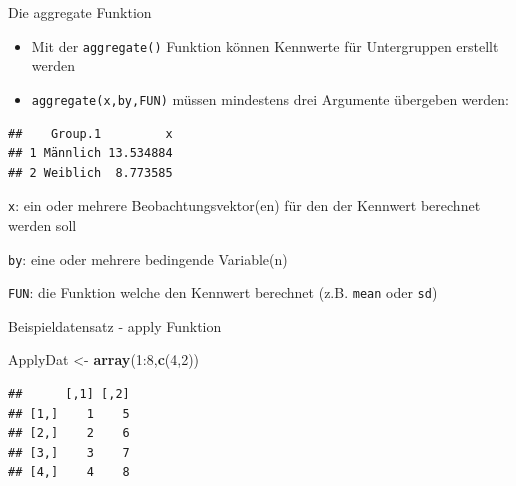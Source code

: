 \documentclass[ignorenonframetext,]{beamer}
\newenvironment{Shaded}{}{}
\newcommand{\KeywordTok}[1]{\textcolor[rgb]{0.00,0.44,0.13}{\textbf{{#1}}}}
\newcommand{\DataTypeTok}[1]{\textcolor[rgb]{0.56,0.13,0.00}{{#1}}}
\newcommand{\DecValTok}[1]{\textcolor[rgb]{0.25,0.63,0.44}{{#1}}}
\newcommand{\StringTok}[1]{\textcolor[rgb]{0.25,0.44,0.63}{{#1}}}
\newcommand{\NormalTok}[1]{{#1}}
\providecommand{\tightlist}{%
\setlength{\itemsep}{0pt}\setlength{\parskip}{0pt}}
\begin{document}
\begin{frame}[fragile]{Die aggregate Funktion}

\begin{itemize}
\tightlist
\item
  Mit der \texttt{aggregate()} Funktion können Kennwerte für
  Untergruppen erstellt werden
\item
  \texttt{aggregate(x,by,FUN)} müssen mindestens drei Argumente
  übergeben werden:
\end{itemize}

\begin{Shaded}
\end{Shaded}

\begin{verbatim}
##    Group.1         x
## 1 Männlich 13.534884
## 2 Weiblich  8.773585
\end{verbatim}

\texttt{x}: ein oder mehrere Beobachtungsvektor(en) für den der Kennwert
berechnet werden soll

\texttt{by}: eine oder mehrere bedingende Variable(n)

\texttt{FUN}: die Funktion welche den Kennwert berechnet (z.B.
\texttt{mean} oder \texttt{sd})

\end{frame}

\begin{frame}[fragile]{Beispieldatensatz - apply Funktion}

\begin{Shaded}
\begin{Highlighting}[]
\NormalTok{ApplyDat <-}\StringTok{ }\KeywordTok{array}\NormalTok{(}\DecValTok{1}\NormalTok{:}\DecValTok{8}\NormalTok{,}\KeywordTok{c}\NormalTok{(}\DecValTok{4}\NormalTok{,}\DecValTok{2}\NormalTok{))}
\end{Highlighting}
\end{Shaded}

\begin{verbatim}
##      [,1] [,2]
## [1,]    1    5
## [2,]    2    6
## [3,]    3    7
## [4,]    4    8
\end{verbatim}

\end{frame}
\end{document}
